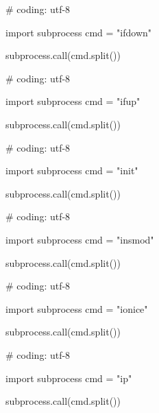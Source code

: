 \begin{mylisting}[label={lst:acpid},language=sh,caption=ifdown]

# coding: utf-8

import subprocess
cmd = "ifdown"

subprocess.call(cmd.split())

\end{mylisting}

\begin{mylisting}[label={lst:acpid},language=sh,caption=ifup]

# coding: utf-8

import subprocess
cmd = "ifup"

subprocess.call(cmd.split())

\end{mylisting}

\begin{mylisting}[label={lst:acpid},language=sh,caption=init]

# coding: utf-8

import subprocess
cmd = "init"

subprocess.call(cmd.split())

\end{mylisting}

\begin{mylisting}[label={lst:acpid},language=sh,caption=insmod]

# coding: utf-8

import subprocess
cmd = "insmod"

subprocess.call(cmd.split())

\end{mylisting}

\begin{mylisting}[label={lst:acpid},language=sh,caption=ionice]

# coding: utf-8

import subprocess
cmd = "ionice"

subprocess.call(cmd.split())

\end{mylisting}

\begin{mylisting}[label={lst:acpid},language=sh,caption=ip]

# coding: utf-8

import subprocess
cmd = "ip"

subprocess.call(cmd.split())

\end{mylisting}

